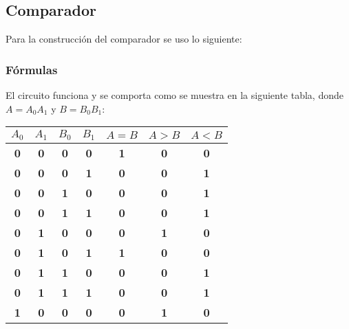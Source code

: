 \documentclass[12pt, letterpaper]{article}
\begin{document}
          \subsection{Comparador}

            \hspace{.5cm}
            Para la construcción del comparador se uso lo siguiente:
 
            \subsubsection{Fórmulas}
                \hspace{.5cm}
                El circuito funciona y se comporta como se muestra en la siguiente tabla, donde $A=A_0A_1$ y $B=B_0B_1$:
                  \begin{table}[htbp]
                    \centering
                    \begin{tabular}{|c|c|c|c|c|c|c|}
                    \hline
                      \textbf{$A_0$} & \textbf{$A_1$} & \textbf{$B_0$} & \textbf{$B_1$} & \textbf{$A = B$} & \textbf{$A > B$} & \textbf{$A < B$} \\ \hline
                      \textbf{0} & \textbf{0} & \textbf{0} & \textbf{0} & \textbf{1} & \textbf{0} & \textbf{0} \\ \hline
                      \textbf{0} & \textbf{0} & \textbf{0} & \textbf{1} & \textbf{0} & \textbf{0} & \textbf{1} \\ \hline
                      \textbf{0} & \textbf{0} & \textbf{1} & \textbf{0} & \textbf{0} & \textbf{0} & \textbf{1} \\ \hline
                      \textbf{0} & \textbf{0} & \textbf{1} & \textbf{1} & \textbf{0} & \textbf{0} &\textbf{1} \\ \hline
                      \textbf{0} & \textbf{1} & \textbf{0} & \textbf{0} & \textbf{0} & \textbf{1} & \textbf{0} \\ \hline
                      \textbf{0} & \textbf{1} & \textbf{0} & \textbf{1} & \textbf{1} & \textbf{0} & \textbf{0} \\ \hline
                      \textbf{0} & \textbf{1} & \textbf{1} & \textbf{0} & \textbf{0} & \textbf{0} & \textbf{1} \\ \hline
                      \textbf{0} & \textbf{1} & \textbf{1} & \textbf{1} & \textbf{0} & \textbf{0} & \textbf{1} \\ \hline
                      \textbf{1} & \textbf{0} & \textbf{0} & \textbf{0} & \textbf{0} & \textbf{1} & \textbf{0} \\ \hline

\end{tabular}
\end{table}
\end{document}

